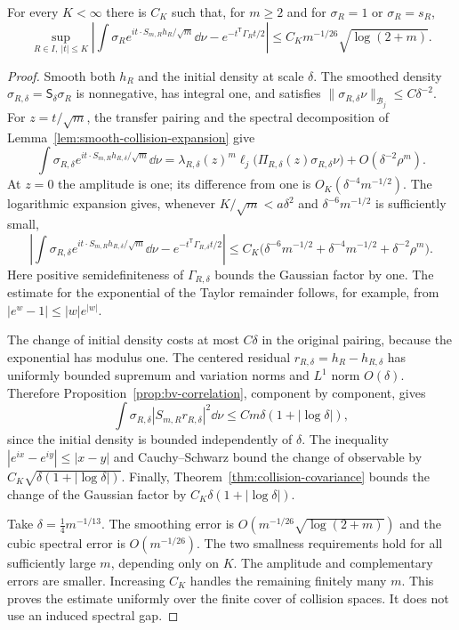 \begin{proposition}
\label{prop:collision-gaussian}
For every $K<\infty$ there is $C_K$ such that, for $m\ge2$ and for
$\sigma_R=1$ or $\sigma_R=s_R$,
\begin{equation}\label{eq:collision-gaussian}
 \sup_{R\in I,\ |t|\le K}
 \left|\int \sigma_R e^{it\cdot S_{m,R}h_R/\sqrt m}\dd\nu
       -e^{-t^{\mathsf T}\Gamma_Rt/2}\right|
       \le C_K m^{-1/26}\sqrt{\log(2+m)}.
\end{equation}
\end{proposition}
\begin{proof}
Smooth both $h_R$ and the initial density at scale $\delta$. The
smoothed density $\sigma_{R,\delta}=\mathsf S_\delta\sigma_R$ is
nonnegative, has integral one, and satisfies
$\|\sigma_{R,\delta}\nu\|_{\mathcal B_j}\le C\delta^{-2}$.
For $z=t/\sqrt m$, the transfer pairing and the spectral decomposition
of Lemma~\ref{lem:smooth-collision-expansion} give
\[
 \int\sigma_{R,\delta}e^{it\cdot S_{m,R}h_{R,\delta}/\sqrt m}\dd\nu
 =\lambda_{R,\delta}(z)^m
       \ell_j\bigl(\Pi_{R,\delta}(z)\sigma_{R,\delta}\nu\bigr)
       +O(\delta^{-2}\rho^m).
\]
At $z=0$ the amplitude is one; its difference from one is
$O_K(\delta^{-4}m^{-1/2})$. The logarithmic expansion gives, whenever
$K/\sqrt m<a\delta^2$ and $\delta^{-6}m^{-1/2}$ is sufficiently small,
\begin{equation}\label{eq:smoothed-characteristic-error}
 \left|\int\sigma_{R,\delta}
 e^{it\cdot S_{m,R}h_{R,\delta}/\sqrt m}\dd\nu
       -e^{-t^{\mathsf T}\Gamma_{R,\delta}t/2}\right|
 \le C_K\bigl(\delta^{-6}m^{-1/2}
          +\delta^{-4}m^{-1/2}+\delta^{-2}\rho^m\bigr).
\end{equation}
Here positive semidefiniteness of $\Gamma_{R,\delta}$ bounds the
Gaussian factor by one. The estimate for the exponential of the
Taylor remainder follows, for example, from
$|e^w-1|\le |w|e^{|w|}$.

The change of initial density costs at most $C\delta$ in the original
pairing, because the exponential has modulus one. The centered
residual $r_{R,\delta}=h_R-h_{R,\delta}$ has uniformly bounded
supremum and variation norms and $L^1$ norm $O(\delta)$. Therefore
Proposition~\ref{prop:bv-correlation}, component by component, gives
\[
 \int\sigma_{R,\delta}
       |S_{m,R}r_{R,\delta}|^2\dd\nu
       \le C m\delta(1+|\log\delta|),
\]
since the initial density is bounded independently of $\delta$.
The inequality $|e^{ix}-e^{iy}|\le|x-y|$ and Cauchy--Schwarz bound
the change of observable by
$C_K\sqrt{\delta(1+|\log\delta|)}$. Finally,
Theorem~\ref{thm:collision-covariance} bounds the change of the Gaussian
factor by $C_K\delta(1+|\log\delta|)$.

Take $\delta=\tfrac14 m^{-1/13}$. The smoothing error is
$O(m^{-1/26}\sqrt{\log(2+m)})$ and the cubic spectral error is
$O(m^{-1/26})$. The two smallness requirements hold for all sufficiently
large $m$, depending only on $K$. The amplitude and complementary errors
are smaller. Increasing $C_K$ handles the remaining finitely many $m$.
This proves the estimate uniformly over the finite cover of collision
spaces. It does not use an induced spectral gap.
\end{proof}

